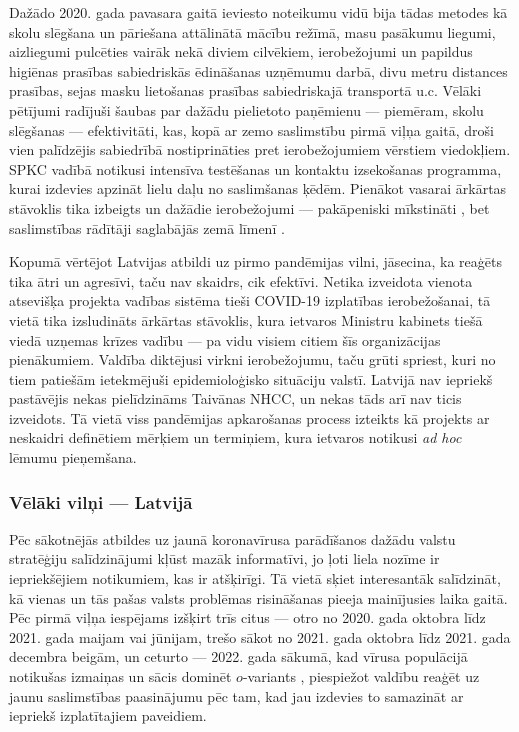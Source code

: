 \documentclass[12pt, a4paper]{article}
\numberwithin{equation}{section} %
\begin{document}
Dažādo 2020. gada pavasara gaitā ieviesto noteikumu vidū bija tādas metodes kā skolu slēgšana un pāriešana attālinātā mācību režīmā, masu pasākumu liegumi, aizliegumi pulcēties vairāk nekā diviem cilvēkiem, ierobežojumi un papildus higiēnas prasības sabiedriskās ēdināšanas uzņēmumu darbā, divu metru distances prasības, sejas masku lietošanas prasības sabiedriskajā transportā u.c. Vēlāki pētījumi radījuši šaubas par dažādu pielietoto paņēmienu --- piemēram, skolu slēgšanas \cite{walsh2021school} --- efektivitāti, kas, kopā ar zemo saslimstību pirmā viļņa gaitā, droši vien palīdzējis sabiedrībā nostiprināties pret ierobežojumiem vērstiem viedokļiem. SPKC vadībā notikusi intensīva testēšanas un kontaktu izsekošanas programma, kurai izdevies apzināt lielu daļu no saslimšanas ķēdēm. Pienākot vasarai ārkārtas stāvoklis tika izbeigts un dažādie ierobežojumi --- pakāpeniski mīkstināti \cite{lv_reopen}, bet saslimstības rādītāji saglabājās zemā līmenī \cite{lv_stats}. 

Kopumā vērtējot Latvijas atbildi uz pirmo pandēmijas vilni, jāsecina, ka reaģēts tika ātri un agresīvi, taču nav skaidrs, cik efektīvi. Netika izveidota vienota atsevišķa projekta vadības sistēma tieši COVID-19 izplatības ierobežošanai, tā vietā tika izsludināts ārkārtas stāvoklis, kura ietvaros Ministru kabinets tiešā viedā uzņemas krīzes vadību \cite{lv_mk_control} --- pa vidu visiem citiem šīs organizācijas pienākumiem. Valdība diktējusi virkni ierobežojumu, taču grūti spriest, kuri no tiem patiešām ietekmējuši epidemioloģisko situāciju valstī. Latvijā nav iepriekš pastāvējis nekas pielīdzināms Taivānas NHCC, un nekas tāds arī nav ticis izveidots. Tā vietā viss pandēmijas apkarošanas process izteikts kā projekts ar neskaidri definētiem mērķiem un termiņiem, kura ietvaros notikusi \textit{ad hoc} lēmumu pieņemšana. 

\subsubsection{Vēlāki vilņi --- Latvijā}

Pēc sākotnējās atbildes uz jaunā koronavīrusa parādīšanos dažādu valstu stratēģiju salīdzinājumi kļūst mazāk informatīvi, jo ļoti liela nozīme ir iepriekšējiem notikumiem, kas ir atšķirīgi. Tā vietā sķiet interesantāk salīdzināt, kā vienas un tās pašas valsts problēmas risināšanas pieeja mainījusies laika gaitā. Pēc pirmā viļņa iespējams izšķirt trīs citus --- otro no 2020. gada oktobra līdz 2021. gada maijam vai jūnijam, trešo sākot no 2021. gada oktobra līdz 2021. gada decembra beigām, un ceturto --- 2022. gada sākumā, kad vīrusa populācijā notikušas izmaiņas un sācis dominēt $o$-variants \cite{lv_omicron_dominate}, piespiežot valdību reaģēt uz jaunu saslimstības paasinājumu pēc tam, kad jau izdevies to samazināt ar iepriekš izplatītajiem paveidiem.  
\end{document}
